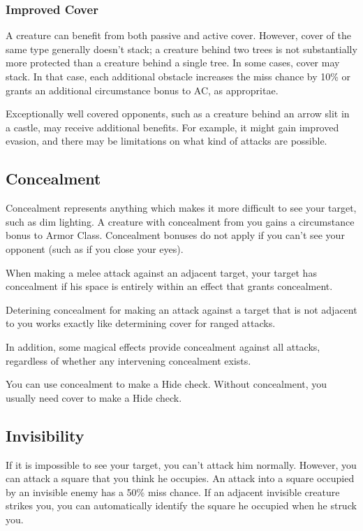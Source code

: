 \subsubsection{Improved Cover}

A creature can benefit from both passive and active cover. However, cover of the same type generally doesn't stack; a creature behind two trees is not substantially more protected than a creature behind a single tree. In some cases, cover may stack. In that case, each additional obstacle increases the miss chance by 10\% or grants an additional  circumstance bonus to AC, as appropritae.

Exceptionally well covered opponents, such as a creature behind an arrow slit in a castle, may receive additional benefits. For example, it might gain improved evasion, and there may be limitations on what kind of attacks are possible.

\subsection{Concealment}
Concealment represents anything which makes it more difficult to see your target, such as dim lighting. A creature with concealment from you gains a  circumstance bonus to Armor Class. Concealment bonuses do not apply if you can't see your opponent (such as if you close your eyes).

 When making a melee attack against an adjacent target, your target has concealment if his space is entirely within an effect that grants concealment.

Deterining concealment for making an attack against a target that is not adjacent to you works exactly like determining cover for ranged attacks.

In addition, some magical effects provide concealment against all attacks, regardless of whether any intervening concealment exists.

 You can use concealment to make a Hide check. Without concealment, you usually need cover to make a Hide check.

\subsection{Invisibility}
If it is impossible to see your target, you can't attack him normally. However, you can attack a square that you think he occupies. An attack into a square occupied by an invisible enemy has a 50\% miss chance. If an adjacent invisible creature strikes you, you can automatically identify the square he occupied when he struck you.

